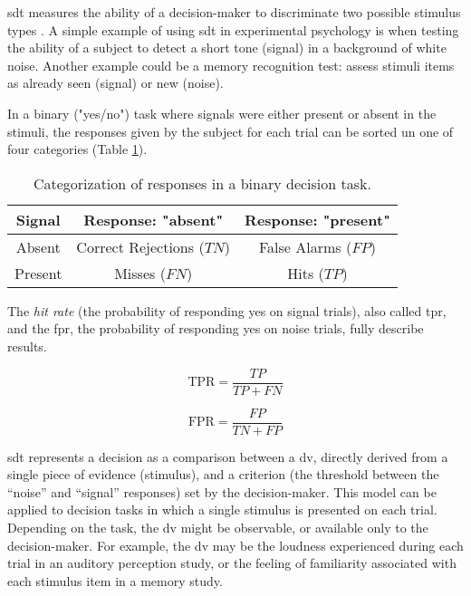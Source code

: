 \acrshort{sdt} measures the ability of a decision-maker to discriminate two possible stimulus types \cite{stanislawCalculationSignalDetection1999}. A simple example of using \acrshort{sdt} in experimental psychology is when testing the ability of a subject to detect a short tone (signal) in a background of white noise. Another example could be a memory recognition test: assess stimuli items as already seen (signal) or new (noise).

 In a binary ("yes/no") task where signals were either present or absent in the stimuli, the responses given by the subject for each trial can be sorted un one of four categories (Table \ref{table:1}).

\begin{table}[h!]
    \centering
    \begin{tabular}{ ||c||c|c|| }
        \hline
        Signal  & Response: "absent"        & Response: "present" \\
        \hline\hline
        Absent  & Correct Rejections ($TN$) & False Alarms ($FP$) \\
        \hline
        Present & Misses ($FN$)             & Hits ($TP$)         \\
        \hline
    \end{tabular}
    \caption{Categorization of responses in a binary decision task.}
    \label{table:1}
\end{table}

The \textit{hit rate} (the probability of responding yes on signal trials), also called \acrfull{tpr}, and the \acrfull{fpr}, the probability of responding yes on noise trials, fully describe results.

$$\text{TPR} = \frac{TP}{TP + FN}$$

$$\text{FPR} = \frac{FP}{TN+FP}$$

\acrshort{sdt} represents a decision as a comparison between a \acrfull{dv}, directly derived from a single piece of evidence (stimulus), and a criterion (the threshold between the “noise” and “signal” responses) set by the decision-maker. This model can be applied to decision tasks in which a single stimulus is presented on each trial. Depending on the task, the \acrshort{dv} might be observable, or available only to the decision-maker. For example, the \acrshort{dv} may be the loudness experienced during each trial in an auditory perception study, or the feeling of familiarity associated with each stimulus item in a memory study.


